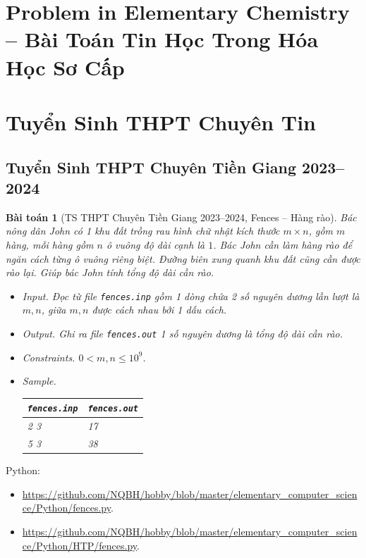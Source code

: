\documentclass{article}
\newtheorem{baitoan}{Bài toán}
\begin{document}

\section{Problem in Elementary Chemistry -- Bài Toán Tin Học Trong Hóa Học Sơ Cấp}


\section{Tuyển Sinh THPT Chuyên Tin}

\subsection{Tuyển Sinh THPT Chuyên Tiền Giang 2023--2024}

\begin{baitoan}[TS THPT Chuyên Tiền Giang 2023--2024, Fences -- Hàng rào]
	Bác nông dân John có 1 khu đất trồng rau hình chữ nhật kích thước $m\times n$, gồm $m$ hàng, mỗi hàng gồm $n$ ô vuông độ dài cạnh là $1$. Bác John cần làm hàng rào để ngăn cách từng ô vuông riêng biệt. Đường biên xung quanh  khu đất cũng cần được rào lại. Giúp bác John tính tổng độ dài cần rào.
	\begin{itemize}
		\item {\sf Input.} Đọc từ file \verb|fences.inp| gồm 1 dòng chứa 2 số nguyên dương lần lượt là $m,n$, giữa $m,n$ được cách nhau bởi 1 dấu cách.
		\item {\sf Output.} Ghi ra file \verb|fences.out| 1 số nguyên dương là tổng độ dài cần rào.
		\item {\sf Constraints.} $0 < m,n\le10^9$.
		\item {\sf Sample.}
		\begin{table}[H]
			\centering
			\begin{tabular}{|l|l|}
				\hline
				{\tt fences.inp} & {\tt fences.out} \\
				\hline
				2 3 & 17 \\
				\hline
				5 3 & 38 \\
				\hline
			\end{tabular}
		\end{table}
	\end{itemize}
\end{baitoan}
Python:
\begin{itemize}
	\item \url{https://github.com/NQBH/hobby/blob/master/elementary_computer_science/Python/fences.py}.
	\item \url{https://github.com/NQBH/hobby/blob/master/elementary_computer_science/Python/HTP/fences.py}.
\end{itemize}
\end{document}
